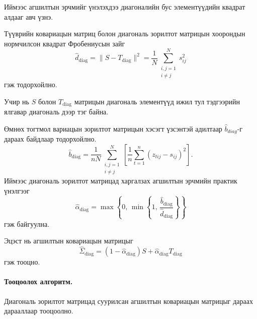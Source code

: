 Иймээс агшилтын эрчмийг үнэлэхдээ
диагоналийн бус элементүүдийн квадрат
алдааг авч үзнэ.

Түүврийн ковариацын матриц болон
диагональ зорилтот матрицын хоорондын
нормчилсон квадрат Фробениусын зайг
\[
\widehat d_{\mathrm{diag}}
=
\|S-T_{\mathrm{diag}}\|^2
=
\frac{1}{N}
\sum_{\substack{i,j=1\\i\neq j}}^{N}
s_{ij}^{2}
\]
гэж тодорхойлно.

Учир нь $S$ болон $T_{\mathrm{diag}}$
матрицын диагональ элементүүд ижил тул
тэдгээрийн ялгавар диагональ дээр тэг байна.

Өмнөх тогтмол вариацын зорилтот матрицын хэсэгт үзсэнтэй адилтаар $\widehat{b}_{diag}$-г дараах байдлаар тодорхойлно. 
\[
\widehat b_{\mathrm{diag}}
	=
	\frac{1}{nN}
	\sum_{\substack{i,j=1\\i\neq j}}^{N}
	\left[
	\frac{1}{n}
	\sum_{t=1}^{n}
	(z_{tij}-s_{ij})^2
	\right].
\]
Иймээс диагональ зорилтот матрицад
харгалзах агшилтын эрчмийн
практик үнэлгээг
\[
	\widehat{\alpha}_{\mathrm{diag}}
	=
	\max\left\{
	0,\,
	\min\left\{
	1,\,
	\frac{\widehat b_{\mathrm{diag}}}
	{\widehat d_{\mathrm{diag}}}
	\right\}
	\right\}
\]
гэж байгуулна.

Эцэст нь агшилтын ковариацын
матрицыг
\[
\widehat{\Sigma}_{\mathrm{diag}}
=
(1-\widehat{\alpha}_{\mathrm{diag}})S
+
\widehat{\alpha}_{\mathrm{diag}}
T_{\mathrm{diag}}
\]
гэж тооцно.

\paragraph{Тооцоолох алгоритм.}

Диагональ зорилтот матрицад суурилсан
агшилтын ковариацын матрицыг дараах
дарааллаар тооцоолно.

